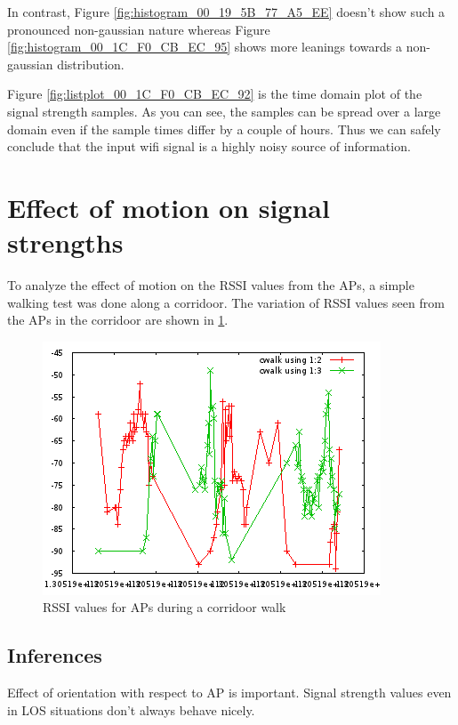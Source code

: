 In contrast, Figure \ref{fig:histogram_00_19_5B_77_A5_EE} doesn't show such a 
pronounced non-gaussian nature whereas 
Figure \ref{fig:histogram_00_1C_F0_CB_EC_95} shows more leanings towards a
non-gaussian distribution.

Figure \ref{fig:listplot_00_1C_F0_CB_EC_92} is the time domain plot of the signal strength
samples. As you can see, the samples can be spread over a large domain even if the 
sample times differ by a couple of hours. Thus we can safely conclude that the 
input wifi signal is a highly noisy source of information.

\section{Effect of motion on signal strengths}

To analyze the effect of motion on the RSSI values from the APs, a simple walking
test was done along a corridoor. The variation of RSSI values seen from the APs in
the corridoor are shown in \ref{fig:wifi_corridoor_walk}.

\begin{figure}\centering
    \includegraphics{figures/wifi_corridoor_walk.png}
    \caption{RSSI values for APs during a corridoor walk \label{fig:wifi_corridoor_walk}}
\end{figure}


\subsection{Inferences}
Effect of orientation with respect to AP is important. Signal strength values
even in LOS situations don't always behave nicely.


